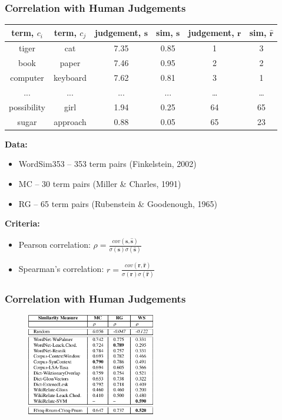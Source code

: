 \documentclass{beamer}
\begin{document}
\begin{frame}
\frametitle{Correlation with Human Judgements}

\begin{table}[h]\footnotesize
\begin{tabular}{ |c|c|c|c|c|c| }
\hline
  term, $c_i$ & term, $c_j$ & judgement, $\mathbf{s}$  & sim, $\mathbf{s}$  & judgement, $\mathbf{r}$ & sim, $\hat{\mathbf{r}}$  \\ \hline \hline
tiger & cat & 7.35 & 0.85 & 1 & 3 \\
book & paper & 7.46 &  0.95 & 2 & 2 \\
computer & keyboard & 7.62 &  0.81 & 3 & 1 \\
... & ... & ... & ...   & \ldots & \ldots \\
possibility & girl & 1.94 & 0.25 & 64 & 65 \\
sugar & approach & 0.88 & 0.05 & 65 & 23 \\ \hline
\end{tabular}
\end{table}


\textbf{Data:}

\begin{itemize}
	\item WordSim353 -- 353 term pairs (Finkelstein, 2002)  
	\item MC -- 30 term pairs  (Miller & Charles, 1991)
	\item RG -- 65 term pairs (Rubenstein & Goodenough, 1965)  
\end{itemize}

\textbf{Criteria:}
\begin{itemize}
\item Pearson correlation:  $\rho = \frac{cov(\mathbf{s},\hat{\mathbf{s}})}{\sigma(\mathbf{s}) \sigma(\hat{\mathbf{s}})}$

 \item Spearman's correlation: $r = \frac{cov(\mathbf{r},\hat{\mathbf{r}})}{\sigma(\mathbf{r}) \sigma(\hat{\mathbf{r}})}$
 
 \end{itemize}
 
\end{frame}

\begin{frame}
\frametitle{Correlation with Human Judgements}

\begin{figure}	
	\centering
	\includegraphics[width=0.5\textwidth]{figures/res-hj-mlg}
\end{figure}

\end{frame}
\end{document}
